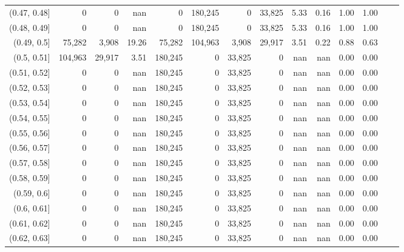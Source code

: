 \begin{tabular}{rrrrrrrrrrrrrr}
(0.47, 0.48]   &        0 &       0 &    nan &        0 &  180,245 &       0 &  33,825 &  5.33 &  0.16 &  1.00 &      1.00 \\
(0.48, 0.49]   &        0 &       0 &    nan &        0 &  180,245 &       0 &  33,825 &  5.33 &  0.16 &  1.00 &      1.00 \\
(0.49, 0.5]    &   75,282 &   3,908 &  19.26 &   75,282 &  104,963 &   3,908 &  29,917 &  3.51 &  0.22 &  0.88 &      0.63 \\
(0.5, 0.51]    &  104,963 &  29,917 &   3.51 &  180,245 &        0 &  33,825 &       0 &   nan &   nan &  0.00 &      0.00 \\
(0.51, 0.52]   &        0 &       0 &    nan &  180,245 &        0 &  33,825 &       0 &   nan &   nan &  0.00 &      0.00 \\
(0.52, 0.53]   &        0 &       0 &    nan &  180,245 &        0 &  33,825 &       0 &   nan &   nan &  0.00 &      0.00 \\
(0.53, 0.54]   &        0 &       0 &    nan &  180,245 &        0 &  33,825 &       0 &   nan &   nan &  0.00 &      0.00 \\
(0.54, 0.55]   &        0 &       0 &    nan &  180,245 &        0 &  33,825 &       0 &   nan &   nan &  0.00 &      0.00 \\
(0.55, 0.56]   &        0 &       0 &    nan &  180,245 &        0 &  33,825 &       0 &   nan &   nan &  0.00 &      0.00 \\
(0.56, 0.57]   &        0 &       0 &    nan &  180,245 &        0 &  33,825 &       0 &   nan &   nan &  0.00 &      0.00 \\
(0.57, 0.58]   &        0 &       0 &    nan &  180,245 &        0 &  33,825 &       0 &   nan &   nan &  0.00 &      0.00 \\
(0.58, 0.59]   &        0 &       0 &    nan &  180,245 &        0 &  33,825 &       0 &   nan &   nan &  0.00 &      0.00 \\
(0.59, 0.6]    &        0 &       0 &    nan &  180,245 &        0 &  33,825 &       0 &   nan &   nan &  0.00 &      0.00 \\
(0.6, 0.61]    &        0 &       0 &    nan &  180,245 &        0 &  33,825 &       0 &   nan &   nan &  0.00 &      0.00 \\
(0.61, 0.62]   &        0 &       0 &    nan &  180,245 &        0 &  33,825 &       0 &   nan &   nan &  0.00 &      0.00 \\
(0.62, 0.63]   &        0 &       0 &    nan &  180,245 &        0 &  33,825 &       0 &   nan &   nan &  0.00 &      0.00 \\

\end{tabular}
